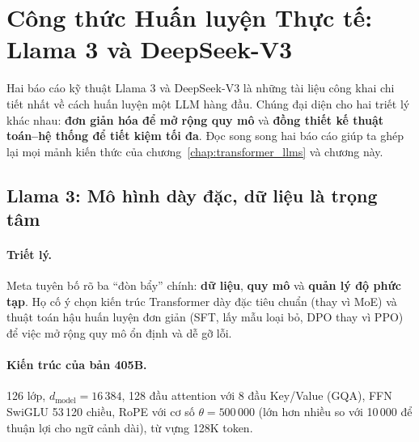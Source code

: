 
\section{Công thức Huấn luyện Thực tế: Llama 3 và DeepSeek-V3 \newtag}
\label{sec:pretraining_case_studies}

Hai báo cáo kỹ thuật Llama 3 \cite{grattafiori2024llama3} và DeepSeek-V3 \cite{deepseekai2024v3} là những tài liệu công khai chi tiết nhất về cách huấn luyện một LLM hàng đầu. Chúng đại diện cho hai triết lý khác nhau: \textbf{đơn giản hóa để mở rộng quy mô} và \textbf{đồng thiết kế thuật toán--hệ thống để tiết kiệm tối đa}. Đọc song song hai báo cáo giúp ta ghép lại mọi mảnh kiến thức của chương~\ref{chap:transformer_llms} và chương này.

\subsection{Llama 3: Mô hình dày đặc, dữ liệu là trọng tâm}
\label{ssec:llama3_recipe}

\paragraph{Triết lý.} Meta tuyên bố rõ ba “đòn bẩy” chính: \textbf{dữ liệu}, \textbf{quy mô} và \textbf{quản lý độ phức tạp}. Họ cố ý chọn kiến trúc Transformer dày đặc tiêu chuẩn (thay vì MoE) và thuật toán hậu huấn luyện đơn giản (SFT, lấy mẫu loại bỏ, DPO thay vì PPO) để việc mở rộng quy mô ổn định và dễ gỡ lỗi.

\paragraph{Kiến trúc của bản 405B.} 126 lớp, $d_{\text{model}} = 16\,384$, 128 đầu attention với 8 đầu Key/Value (GQA), FFN SwiGLU 53\,120 chiều, RoPE với cơ số $\theta = 500\,000$ (lớn hơn nhiều so với 10\,000 để thuận lợi cho ngữ cảnh dài), từ vựng 128K token.

